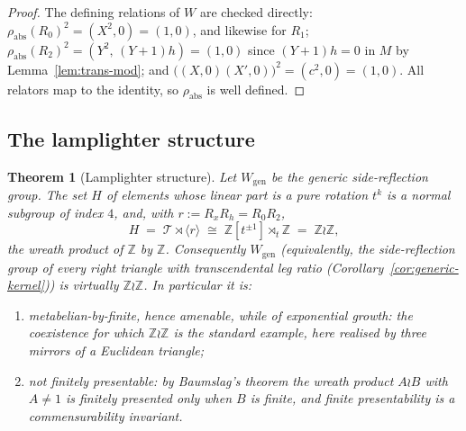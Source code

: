 \documentclass[11pt]{article}
\theoremstyle{plain}
\newtheorem{theorem}{Theorem}
\theoremstyle{definition}
\theoremstyle{remark}
\begin{document}
\begin{proof}
The defining relations of $W$ are checked directly:
$\rho_{\mathrm{abs}}(R_0)^2 = (X^2, 0) = (1, 0)$, and likewise for
$R_1$; $\rho_{\mathrm{abs}}(R_2)^2 = (Y^2,\, (Y+1)h) = (1, 0)$ since
$(Y+1)h = 0$ in $M$ by Lemma~\ref{lem:trans-mod}; and
$\bigl((X,0)(X',0)\bigr)^2 = (c^2, 0) = (1, 0)$.  All relators map to
the identity, so $\rho_{\mathrm{abs}}$ is well defined.
\end{proof}

\subsection{The lamplighter structure}
\label{ssec:lamplighter}

\begin{theorem}[Lamplighter structure]
\label{thm:lamplighter}
Let $W_{\mathrm{gen}}$ be the generic side-reflection group.  The set
$H$ of elements whose linear part is a pure rotation $t^k$ is a normal
subgroup of index $4$, and, with $r := R_x R_h = R_0 R_2$,
\[
H \;=\; \mathcal{T} \rtimes \langle r \rangle
\;\cong\; \mathbb{Z}[t^{\pm 1}] \rtimes_t \mathbb{Z}
\;=\; \mathbb{Z} \wr \mathbb{Z},
\]
the wreath product of $\mathbb{Z}$ by $\mathbb{Z}$.  Consequently
$W_{\mathrm{gen}}$ (equivalently, the side-reflection group of
\emph{every} right triangle with transcendental leg ratio
(Corollary~\ref{cor:generic-kernel})) is virtually $\mathbb{Z} \wr
\mathbb{Z}$.  In particular it is:
\begin{enumerate}[label=\textup{(\roman*)},itemsep=0.15em]
\item metabelian-by-finite, hence \emph{amenable}, while of exponential
growth: the coexistence for which $\mathbb{Z} \wr \mathbb{Z}$ is the
standard example, here realised by three mirrors of a Euclidean
triangle;
\item \emph{not finitely presentable}: by Baumslag's theorem
\cite{Baumslag1961} the
wreath product $A \wr B$ with $A \neq 1$ is finitely presented only when
$B$ is finite, and finite presentability is a commensurability
invariant.
\end{enumerate}
\end{theorem}
\end{document}
